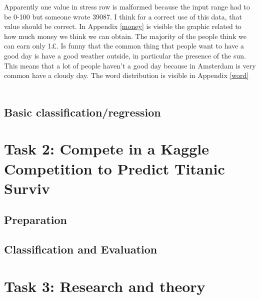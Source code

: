 \documentclass{vldb}
\begin{document}
		Apparently one value in stress row is malformed because the input range had to be 0-100 but someone wrote 39087. I think for a correct use of this data, that value should be correct. In Appendix \ref{money} is visible the graphic related to how much money we think we can obtain. The majority of the people think we can earn only 1£.  Is funny that the common thing that people want to have a good day is have a good weather outside, in particular the presence of the sun. This means that a lot of people haven't a good day because in Amsterdam is very common have a cloudy day. The word distribution is visible in Appendix \ref{word} \\\\
		
	\subsection{Basic classification/regression}
	
\section{Task 2: Compete in a Kaggle Competition to Predict Titanic Surviv}
	\subsection{Preparation}
	\subsection{Classification and Evaluation}

\section{Task 3: Research and theory}
\end{document}
